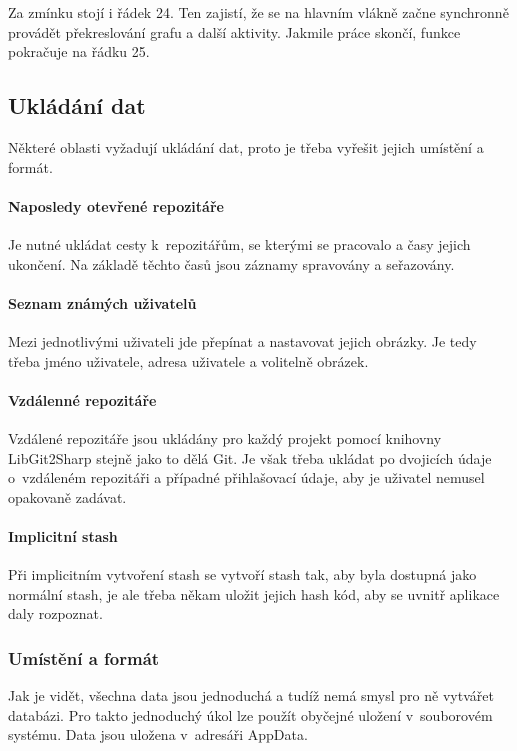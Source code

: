 \documentclass[
  biblatex,
  glossaries,
  index
]{kidiplom}
\begin{document}
Za zmínku stojí i řádek 24. Ten zajistí, že se na hlavním vlákně začne synchronně provádět překreslování grafu a další aktivity. Jakmile práce skončí, funkce pokračuje na řádku 25.

\subsection{Ukládání dat}
Některé oblasti vyžadují ukládání dat, proto je třeba vyřešit jejich umístění a formát.

\paragraph*{Naposledy otevřené repozitáře}
Je nutné ukládat cesty k~repozitářům, se kterými se pracovalo a časy jejich ukončení. Na základě těchto časů jsou záznamy spravovány a seřazovány.

\paragraph*{Seznam známých uživatelů}
Mezi jednotlivými uživateli jde přepínat a nastavovat jejich obrázky. Je tedy třeba jméno uživatele, adresa uživatele a volitelně obrázek.

\paragraph*{Vzdálenné repozitáře}
Vzdálené repozitáře jsou ukládány pro každý projekt pomocí knihovny LibGit2Sharp stejně jako to dělá Git. Je však třeba ukládat po dvojicích údaje o~vzdáleném repozitáři a případné přihlašovací údaje, aby je uživatel nemusel opakovaně zadávat.

\paragraph*{Implicitní stash}
Při implicitním vytvoření stash se vytvoří stash tak, aby byla dostupná jako normální stash, je ale třeba někam uložit jejich hash kód, aby se uvnitř aplikace daly rozpoznat.

\subsubsection{Umístění a formát}
Jak je vidět, všechna data jsou jednoduchá a tudíž nemá smysl pro ně vytvářet databázi. Pro takto jednoduchý úkol lze použít obyčejné uložení v~souborovém systému. Data jsou uložena v~adresáři AppData.
\end{document}
